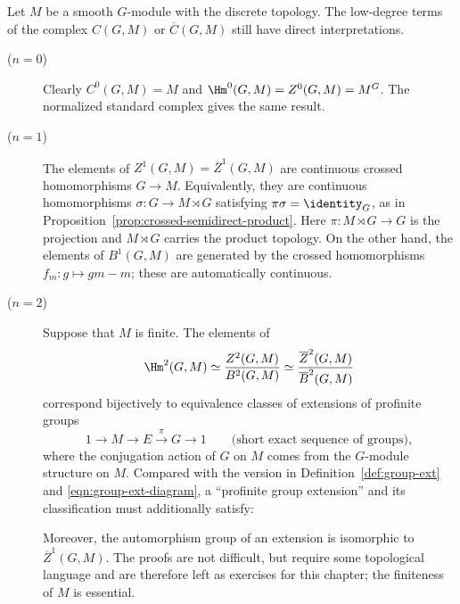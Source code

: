 Let $M$ be a smooth $G$-module with the discrete topology. The low-degree
terms of the complex $C(G,M)$ or $\overline{C}(G,M)$ still have direct
interpretations.
\begin{description}
	\item[($n=0$)] Clearly $C^0(G,M)=M$ and
	$\Hm^0(G,M)=Z^0(G,M)=M^G$. The normalized standard complex gives the
	same result.
	\item[($n=1$)] The elements of
	$Z^1(G,M)=\overline{Z}^1(G,M)$ are continuous crossed homomorphisms
	$G\to M$. Equivalently, they are continuous homomorphisms
	$\sigma:G\to M\rtimes G$ satisfying $\pi\sigma=\identity_G$, as in
	Proposition~\ref{prop:crossed-semidirect-product}. Here
	$\pi:M\rtimes G\to G$ is the projection and $M\rtimes G$ carries the
	product topology. On the other hand, the elements of $B^1(G,M)$ are
	generated by the crossed homomorphisms $f_m:g\mapsto gm-m$; these are
	automatically continuous.

	\item[($n=2$)] Suppose that $M$ is finite. The elements of
	\[ \Hm^2(G,M)\simeq\frac{Z^2(G,M)}{B^2(G,M)}
	\simeq\frac{\overline{Z}^2(G,M)}{\overline{B}^2(G,M)} \]
	correspond bijectively to equivalence classes of extensions of profinite
	groups
	\[ 1\to M\to E\xrightarrow{\pi}G\to1
	\qquad\text{(short exact sequence of groups)}, \]
	where the conjugation action of $G$ on $M$ comes from the $G$-module
	structure on $M$. Compared with the version in
	Definition~\ref{def:group-ext} and \eqref{eqn:group-ext-diagram}, a
	``profinite group extension'' and its classification must additionally
	satisfy:

	Moreover, the automorphism group of an extension is isomorphic to
	$\overline{Z}^1(G,M)$. The proofs are not difficult, but require some
	topological language and are therefore left as exercises for this chapter;
	the finiteness of $M$ is essential.
\end{description}

